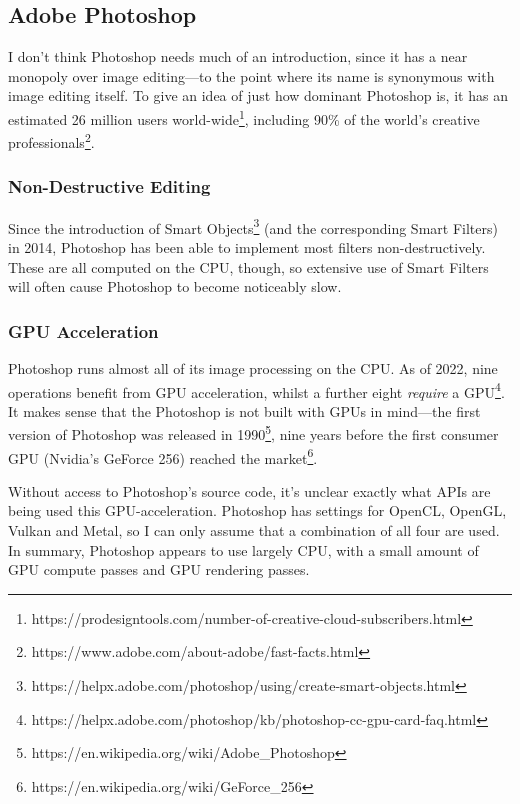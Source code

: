 \documentclass[12pt]{article}
\begin{document}
\subsection{Adobe Photoshop}

I don't think Photoshop needs much of an introduction, since it has a near monopoly over image
editing---to the point where its name is synonymous with image editing itself.  To give an idea of
just how dominant Photoshop is, it has an estimated 26 million users
world-wide\footnote{https://prodesigntools.com/number-of-creative-cloud-subscribers.html}, including
90\% of the world's creative
professionals\footnote{https://www.adobe.com/about-adobe/fast-facts.html}.

\subsubsection{Non-Destructive Editing}

Since the introduction of Smart
Objects\footnote{https://helpx.adobe.com/photoshop/using/create-smart-objects.html} (and the
corresponding Smart Filters) in 2014, Photoshop has been able to implement most filters
non-destructively.  These are all computed on the CPU, though, so extensive use of Smart Filters
will often cause Photoshop to become noticeably slow.

\subsubsection{GPU Acceleration}

Photoshop runs almost all of its image processing on the CPU.  As of 2022, nine operations benefit
from GPU acceleration, whilst a further eight \emph{require} a
GPU\footnote{https://helpx.adobe.com/photoshop/kb/photoshop-cc-gpu-card-faq.html}.  It makes sense
that the Photoshop is not built with GPUs in mind---the first version of Photoshop was released in
1990\footnote{https://en.wikipedia.org/wiki/Adobe\_Photoshop}, nine years before the first consumer
GPU (Nvidia's GeForce 256) reached the market\footnote{https://en.wikipedia.org/wiki/GeForce\_256}.

Without access to Photoshop's source code, it's unclear exactly what APIs are being used this
GPU-acceleration.  Photoshop has settings for OpenCL, OpenGL, Vulkan and Metal, so I can only assume
that a combination of all four are used.  In summary, Photoshop appears to use largely CPU, with a
small amount of GPU compute passes and GPU rendering passes.
\end{document}

